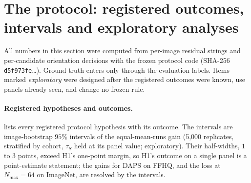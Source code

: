 \section{The protocol: registered outcomes, intervals and exploratory analyses}
\label{sec:suppl-protocol-empirical}

All numbers in this section were computed from per-image residual strings and per-candidate orientation decisions with the frozen protocol code (SHA-256 \texttt{d5f973fe}\ldots).
Ground truth enters only through the evaluation labels.
Items marked \emph{exploratory} were designed after the registered outcomes were known, use panels already seen, and change no frozen rule.

\paragraph{Registered hypotheses and outcomes.}
 lists every registered protocol hypothesis with its outcome.
The intervals are image-bootstrap $95\%$ intervals of the equal-mean-runs gain (5{,}000 replicates, stratified by cohort, $\tau_S$ held at its panel value; exploratory).
Their half-widths, $1$ to $3$ points, exceed H1's one-point margin, so H1's outcome on a single panel is a point-estimate statement; the gains for DAPS on FFHQ, and the loss at $N_{\max}=64$ on ImageNet, are resolved by the intervals.


